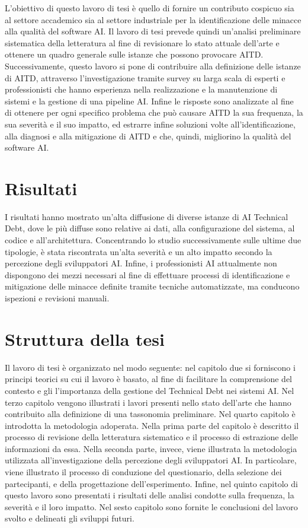 L'obiettivo di questo lavoro di tesi è quello di fornire un contributo cospicuo sia al settore accademico sia al settore industriale per la identificazione delle minacce alla qualità del software AI.
Il lavoro di tesi prevede quindi un'analisi preliminare sistematica della letteratura al fine di revisionare lo stato attuale dell'arte e ottenere un quadro generale sulle istanze che possono provocare AITD.
Successivamente, questo lavoro si pone di contribuire alla definizione delle istanze di AITD, attraverso l'investigazione tramite survey su larga scala di esperti e professionisti che hanno esperienza nella realizzazione e la manutenzione di sistemi e la gestione di una pipeline AI.
Infine le risposte sono analizzate al fine di ottenere per ogni specifico problema che può causare AITD la sua frequenza, la sua severità e il suo impatto, ed estrarre infine soluzioni volte all'identificazione, alla diagnosi e alla mitigazione di AITD e che, quindi, migliorino la qualità del software AI.

\section{Risultati}
I risultati hanno mostrato un'alta diffusione di diverse istanze di AI Technical Debt, dove le più diffuse sono relative ai dati, alla configurazione del sistema, al codice e all'architettura.
Concentrando lo studio successivamente sulle ultime due tipologie, è stata riscontrata un'alta severità e un alto impatto secondo la percezione degli sviluppatori AI.
Infine, i professionisti AI attualmente non dispongono dei mezzi necessari al fine di effettuare processi di identificazione e mitigazione delle minacce definite tramite tecniche automatizzate, ma conducono ispezioni e revisioni manuali.
\section{Struttura della tesi}

Il lavoro di tesi è organizzato nel modo seguente: nel capitolo due si forniscono i principi teorici su cui il lavoro è basato, al fine di facilitare la comprensione del contesto e gli l'importanza della gestione del Technical Debt nei sistemi AI. Nel terzo capitolo vengono illustrati i lavori presenti nello stato dell'arte che hanno contribuito alla definizione di una tassonomia preliminare. Nel quarto capitolo è introdotta la metodologia adoperata. Nella prima parte del capitolo è descritto il processo di revisione della letteratura sistematico e il processo di estrazione delle informazioni da essa.
Nella seconda parte, invece, viene illustrata la metodologia utilizzata all'investigazione della percezione degli sviluppatori AI.
In particolare, viene illustrato il processo di conduzione del questionario, della selezione dei partecipanti, e della progettazione dell'esperimento.
Infine, nel quinto capitolo di questo lavoro sono presentati i risultati delle analisi condotte sulla frequenza, la severità e il loro impatto.
Nel sesto capitolo sono fornite le conclusioni del lavoro svolto e delineati gli sviluppi futuri.